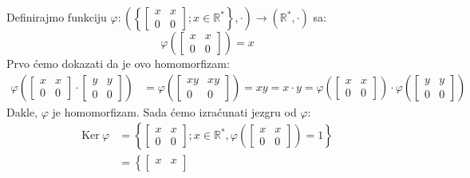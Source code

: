 \documentclass{exam}
\begin{document}
\begin{questions}
\begin{solution}
  Definirajmo funkciju $\displaystyle \varphi: \left(\left\{
      \begin{bmatrix}
        x & x\\
        0 & 0
  \end{bmatrix}; x \in \mathbb{R}^*\right\}, \cdot\right) \rightarrow (\mathbb{R}^*, \cdot)$ sa:
  \[
    \varphi\left(
      \begin{bmatrix}
        x & x\\
        0 & 0
    \end{bmatrix}\right) = x
  \]
  Prvo ćemo dokazati da je ovo homomorfizam:
  \begin{align*}
    \varphi\left(
      \begin{bmatrix}
        x & x\\
        0 & 0
      \end{bmatrix} \cdot
      \begin{bmatrix}
        y & y\\
        0 & 0
    \end{bmatrix}\right) &= \varphi\left(
      \begin{bmatrix}
        xy & xy\\
        0 & 0
    \end{bmatrix}\right) = xy = x \cdot y = \varphi\left(
      \begin{bmatrix}
        x & x\\
        0 & 0
    \end{bmatrix}\right) \cdot \varphi\left(
      \begin{bmatrix}
        y & y\\
        0 & 0
    \end{bmatrix}\right)
  \end{align*}
  Dakle, $\varphi$ je homomorfizam. Sada ćemo izraćunati jezgru od $\varphi$:
  \begin{align*}
    \text{Ker}\ \varphi &= \left\{
      \begin{bmatrix}
        x & x\\
        0 & 0
      \end{bmatrix}; x \in \mathbb{R}^*, \varphi\left(
        \begin{bmatrix}
          x & x\\
          0 & 0
    \end{bmatrix}\right) = 1\right\}\\
    &= \left\{
      \begin{bmatrix}
        x & x\\

\end{bmatrix}
\end{align*}
\end{solution}
\end{questions}
\end{document}
